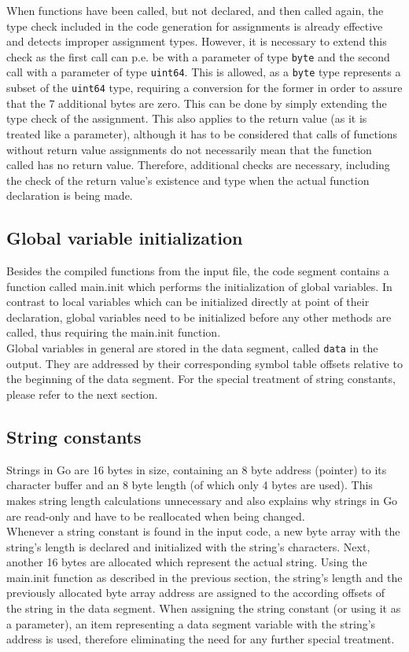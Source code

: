 \documentclass[a4paper]{scrartcl}
\let\section\subsection
\let\subsection\subsubsection
\let\subsubsection\paragraph
\let\paragraph\subparagraph
\let\subparagraph\undefined
\begin{document}
      When functions have been called, but not declared, and then called again, the type check included in the code generation for assignments is already effective and detects improper assignment types. However, it is necessary to extend this check as the first call can p.e. be with a parameter of type \texttt{byte} and the second call with a parameter of type \texttt{uint64}. This is allowed, as a \texttt{byte} type represents a subset of the \texttt{uint64} type, requiring a conversion for the former in order to assure that the 7 additional bytes are zero. This can be done by simply extending the type check of the assignment. This also applies to the return value (as it is treated like a parameter), although it has to be considered that calls of functions without return value assignments do not necessarily mean that the function called has no return value. Therefore, additional checks are necessary, including the check of the return value's existence and type when the actual function declaration is being made.

    \section{Global variable initialization}
        Besides the compiled functions from the input file, the code segment contains a function called main.init which performs the initialization of global variables. In contrast to local variables which can be initialized directly at point of their declaration, global variables need to be initialized before any other methods are called, thus requiring the main.init function.\\
        Global variables in general are stored in the data segment, called \texttt{data} in the output. They are addressed by their corresponding symbol table offsets relative to the beginning of the data segment. For the special treatment of string constants, please refer to the next section.

    \section{String constants} \label{String constants}
        Strings in Go are 16 bytes in size, containing an 8 byte address (pointer) to its character buffer and an 8 byte length (of which only 4 bytes are used). This makes string length calculations unnecessary and also explains why strings in Go are read-only and have to be reallocated when being changed.\\
        Whenever a string constant is found in the input code, a new byte array with the string's length is declared and initialized with the string's characters. Next, another 16 bytes are allocated which represent the actual string. Using the main.init function as described in the previous section, the string's length and the previously allocated byte array address are assigned to the according offsets of the string in the data segment. When assigning the string constant (or using it as a parameter), an item representing a data segment variable with the string's address is used, therefore eliminating the need for any further special treatment.
\end{document}
